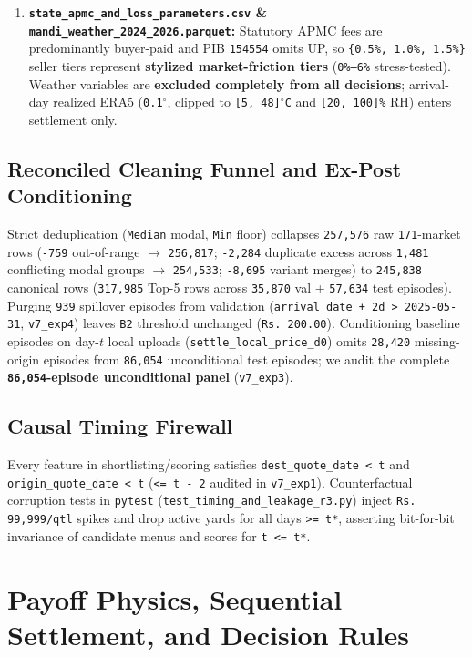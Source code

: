 \documentclass[11pt,a4paper]{article}
\begin{document}
\begin{enumerate}
  \item \textbf{\texttt{state\_apmc\_and\_loss\_parameters.csv} \& \texttt{mandi\_weather\_2024\_2026.parquet}:} Statutory APMC fees are predominantly buyer-paid and PIB \texttt{154554} omits UP, so \texttt{\{0.5\%, 1.0\%, 1.5\%\}} seller tiers represent \textbf{stylized market-friction tiers} (\texttt{0\%--6\%} stress-tested). Weather variables are \textbf{excluded completely from all decisions}; arrival-day realized ERA5 (\texttt{0.1$^\circ$}, clipped to \texttt{[5, 48]$^\circ$C} and \texttt{[20, 100]\%} RH) enters settlement only.
\end{enumerate}

\subsection{Reconciled Cleaning Funnel and Ex-Post Conditioning}

Strict deduplication (\texttt{Median} modal, \texttt{Min} floor) collapses \texttt{257,576} raw \texttt{171}-market rows (\texttt{-759} out-of-range $\to$ \texttt{256,817}; \texttt{-2,284} duplicate excess across \texttt{1,481} conflicting modal groups $\to$ \texttt{254,533}; \texttt{-8,695} variant merges) to \texttt{245,838} canonical rows (\texttt{317,985} Top-5 rows across \texttt{35,870} val + \texttt{57,634} test episodes). Purging \texttt{939} spillover episodes from validation (\texttt{arrival\_date + 2d > 2025-05-31}, \texttt{v7\_exp4}) leaves \texttt{B2} threshold unchanged (\texttt{Rs.\,200.00}). Conditioning baseline episodes on day-$t$ local uploads (\texttt{settle\_local\_price\_d0}) omits \texttt{28,420} missing-origin episodes from \texttt{86,054} unconditional test episodes; we audit the complete \textbf{\texttt{86,054}-episode unconditional panel} (\texttt{v7\_exp3}).

\subsection{Causal Timing Firewall}

Every feature in shortlisting/scoring satisfies \texttt{dest\_quote\_date < t} and \texttt{origin\_quote\_date < t} (\texttt{<= t - 2} audited in \texttt{v7\_exp1}). Counterfactual corruption tests in \texttt{pytest} (\texttt{test\_timing\_and\_leakage\_r3.py}) inject \texttt{Rs.\,99,999/qtl} spikes and drop active yards for all days \texttt{>= t*}, asserting bit-for-bit invariance of candidate menus and scores for \texttt{t <= t*}.

\section{Payoff Physics, Sequential Settlement, and Decision Rules}
\end{document}
